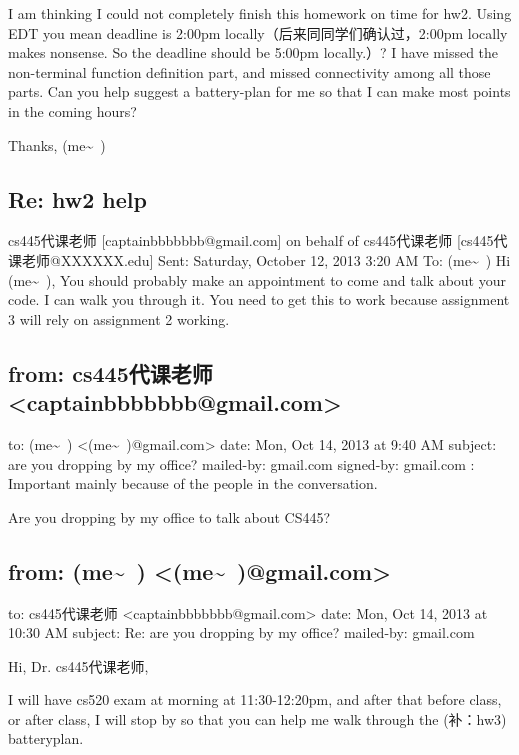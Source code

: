 \documentclass[12pt]{book}
\begin{document}
I am thinking I could not completely finish this homework on time for hw2. Using EDT you mean deadline is 2:00pm locally（后来同同学们确认过，2:00pm locally makes nonsense. So the deadline should be 5:00pm locally.）? 
I have missed the non-terminal function definition part, and missed connectivity among all those parts. Can you help suggest a battery-plan for me so that I can make most points in the coming hours?

Thanks,
(me\textasciitilde{}~)

\subsection{Re: hw2 help}
\label{sec-22-1-2}
cs445代课老师 [captainbbbbbbb@gmail.com] on behalf of cs445代课老师 [cs445代课老师@XXXXXX.edu]
Sent:        Saturday, October 12, 2013 3:20 AM
To:        
(me\textasciitilde{}~)
Hi (me\textasciitilde{}~),
             You should probably make an appointment to come and talk about your code.   I can walk you
through it.   You need to get this to work because assignment 3 will rely on assignment 2 working.

\subsection{from:         cs445代课老师 <captainbbbbbbb@gmail.com>}
\label{sec-22-1-3}
to:         (me\textasciitilde{}~) <(me\textasciitilde{}~)@gmail.com>
date:         Mon, Oct 14, 2013 at 9:40 AM
subject:         are you dropping by my office?
mailed-by:         gmail.com
signed-by:         gmail.com
:         Important mainly because of the people in the conversation.

Are you dropping by my office to talk about CS445?

\subsection{from:         (me\textasciitilde{}~) <(me\textasciitilde{}~)@gmail.com>}
\label{sec-22-1-4}
to:         cs445代课老师 <captainbbbbbbb@gmail.com>
date:         Mon, Oct 14, 2013 at 10:30 AM
subject:         Re: are you dropping by my office?
mailed-by:         gmail.com

Hi, Dr. cs445代课老师, 

I will have cs520 exam at morning at 11:30-12:20pm, and after that before class, or after class, I will stop by so that you can help me walk through the (补：hw3) batteryplan. 
\end{document}
